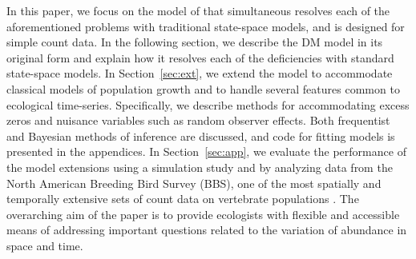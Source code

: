 \documentclass[12pt]{article}
\begin{document}
In this paper, we focus on the model of \citet[henceforth the DM model]{dail_madsen:2011}
that simultaneous resolves each of the aforementioned problems with
traditional state-space models, and is designed for simple count data.
In the following section, we describe the DM model in its original
form and explain how it resolves each of the deficiencies with
standard state-space models. In Section~\ref{sec:ext}, we extend the
model to accommodate classical models of population growth and
to handle several features common to ecological
time-series. Specifically, we describe methods for accommodating
excess zeros and nuisance variables such as random observer effects.
Both frequentist and Bayesian methods of inference are discussed, and
code for fitting models is presented in the appendices.
In Section~\ref{sec:app}, we evaluate the performance of the model
extensions using a simulation study and by analyzing data from the
North American Breeding Bird Survey (BBS), one of
the most spatially and temporally extensive sets of count data on
vertebrate populations \citep{robbins_etal:1986}. The overarching aim
of the paper is to provide ecologists with flexible and accessible means of
addressing important questions related to the variation of abundance in
space and time.
\end{document}
